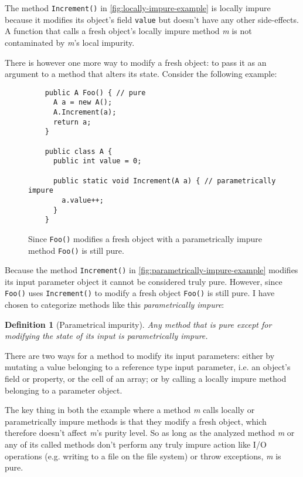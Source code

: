 \documentclass[a4paper,12pt]{article}
\newtheorem{definition}{Definition} %
\begin{document}
The method \texttt{Increment()} in \autoref{fig:locally-impure-example} is locally impure because it modifies its object's field \texttt{value} but doesn't have any other side-effects. A function that calls a fresh object's locally impure method \textit{m} is not contaminated by \textit{m}'s local impurity.

There is however one more way to modify a fresh object: to pass it as an argument to a method that alters its state. Consider the following example:

\begin{figure}[H]
  \centering
  \begin{lstlisting}
    public A Foo() { // pure
      A a = new A();
      A.Increment(a);
      return a;
    }

    public class A {
      public int value = 0;

      public static void Increment(A a) { // parametrically impure
        a.value++;
      }
    }
  \end{lstlisting}
  \caption{Since \texttt{Foo()} modifies a fresh object with a parametrically impure method \texttt{Foo()} is still pure.}
  \label{fig:parametrically-impure-example}
\end{figure}

Because the method \texttt{Increment()} in \autoref{fig:parametrically-impure-example} modifies its input parameter object it cannot be considered truly pure. However, since \texttt{Foo()} uses \texttt{Increment()} to modify a fresh object \texttt{Foo()} is still pure. I have chosen to categorize methods like this \textit{parametrically impure}:

\begin{definition}[Parametrical impurity] \label{def:parametrically-impure}
  Any method that is pure except for modifying the state of its input is parametrically impure.
\end{definition}

There are two ways for a method to modify its input parameters: either by mutating a value belonging to a reference type input parameter, i.e. an object's field or property, or the cell of an array; or by calling a locally impure method belonging to a parameter object.

The key thing in both the example where a method \textit{m} calls locally or parametrically impure methods is that they modify a fresh object, which therefore doesn't affect \textit{m}'s purity level. So as long as the analyzed method \textit{m} or any of its called methods don't perform any truly impure action like I/O operations (e.g. writing to a file on the file system) or throw exceptions, \textit{m} is pure.
\end{document}
